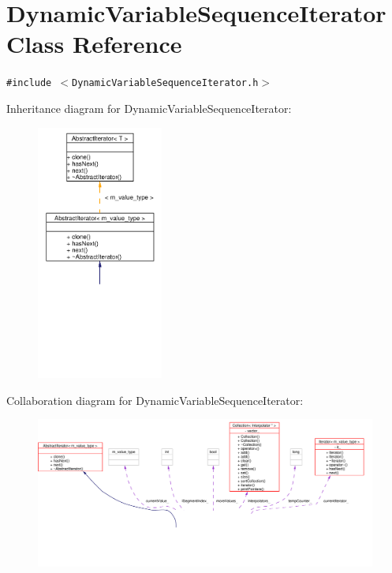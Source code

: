 \hypertarget{classDynamicVariableSequenceIterator}{
\section{Dynamic\-Variable\-Sequence\-Iterator Class Reference}
\label{classDynamicVariableSequenceIterator}
}
{\tt \#include $<$Dynamic\-Variable\-Sequence\-Iterator.h$>$}

Inheritance diagram for Dynamic\-Variable\-Sequence\-Iterator:\begin{figure}[H]
\begin{center}
\leavevmode
\includegraphics[width=118pt]{classDynamicVariableSequenceIterator__inherit__graph}
\end{center}
\end{figure}
Collaboration diagram for Dynamic\-Variable\-Sequence\-Iterator:\begin{figure}[H]
\begin{center}
\leavevmode
\includegraphics[width=420pt]{classDynamicVariableSequenceIterator__coll__graph}
\end{center}
\end{figure}
